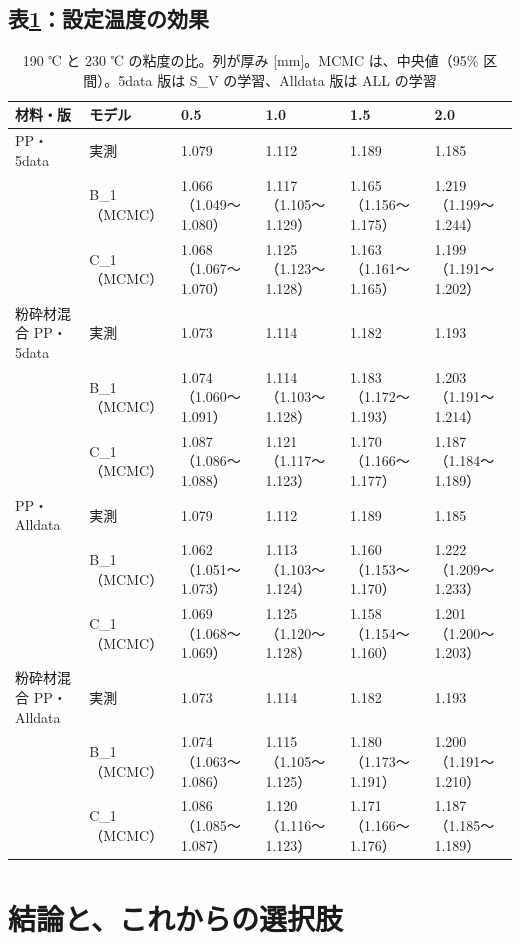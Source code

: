 \documentclass[paper=a4paper,fontsize=10.5pt,line_length=44zw,number_of_lines=38]{jlreq}
\begin{document}
\subsection{表\ref{tab:tset}：設定温度の効果}
\begin{table}[H]
\caption{190 ℃ と 230 ℃ の粘度の比。列が厚み [mm]。MCMC は、中央値（95\% 区間）。5data 版は S\_V の学習、Alldata 版は ALL の学習}\label{tab:tset}
\footnotesize
\begin{tabularx}{\linewidth}{@{}llXXXX@{}}
\toprule
材料・版 & モデル & 0.5 & 1.0 & 1.5 & 2.0 \\
\midrule
PP・5data & 実測 & 1.079 & 1.112 & 1.189 & 1.185 \\
 & B\_1（MCMC） & 1.066（1.049〜1.080） & 1.117（1.105〜1.129） & 1.165（1.156〜1.175） & 1.219（1.199〜1.244） \\
 & C\_1（MCMC） & 1.068（1.067〜1.070） & 1.125（1.123〜1.128） & 1.163（1.161〜1.165） & 1.199（1.191〜1.202） \\
\midrule
粉砕材混合 PP・5data & 実測 & 1.073 & 1.114 & 1.182 & 1.193 \\
 & B\_1（MCMC） & 1.074（1.060〜1.091） & 1.114（1.103〜1.128） & 1.183（1.172〜1.193） & 1.203（1.191〜1.214） \\
 & C\_1（MCMC） & 1.087（1.086〜1.088） & 1.121（1.117〜1.123） & 1.170（1.166〜1.177） & 1.187（1.184〜1.189） \\
\midrule
PP・Alldata & 実測 & 1.079 & 1.112 & 1.189 & 1.185 \\
 & B\_1（MCMC） & 1.062（1.051〜1.073） & 1.113（1.103〜1.124） & 1.160（1.153〜1.170） & 1.222（1.209〜1.233） \\
 & C\_1（MCMC） & 1.069（1.068〜1.069） & 1.125（1.120〜1.128） & 1.158（1.154〜1.160） & 1.201（1.200〜1.203） \\
\midrule
粉砕材混合 PP・Alldata & 実測 & 1.073 & 1.114 & 1.182 & 1.193 \\
 & B\_1（MCMC） & 1.074（1.063〜1.086） & 1.115（1.105〜1.125） & 1.180（1.173〜1.191） & 1.200（1.191〜1.210） \\
 & C\_1（MCMC） & 1.086（1.085〜1.087） & 1.120（1.116〜1.123） & 1.171（1.166〜1.176） & 1.187（1.185〜1.189） \\

\bottomrule
\end{tabularx}
\end{table}


\section{結論と、これからの選択肢}
\end{document}
